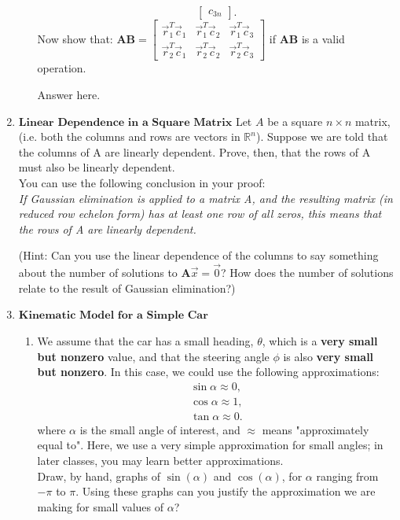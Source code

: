 \documentclass[11pt]{article}
\def\R{\mathbb{R}} %
\def\A{\textbf{A}} %
\def\AB{\textbf{AB}}
\begin{document}
\begin{enumerate}
\begin{enumerate}
\[\begin{bmatrix}
                                    c_{3n}
                        \end{bmatrix}.
                \]
                Now show that:
$\AB = \begin{bmatrix}
    \vec r_1^T \vec c_1 & \vec r_1^T \vec c_2 & \vec r_1^T \vec c_3 \\
    \vec r_2^T \vec c_1 & \vec r_2^T \vec c_2 & \vec r_2^T \vec c_3
\end{bmatrix}$ if $\AB$ is a valid operation.
        \begin{Answer}
            Answer here.
        \end{Answer}
       \end{enumerate}
   
   \newpage
   \item $\textbf{Linear Dependence in a Square Matrix}$
   Let $A$ be a square $n\times n$ matrix, (i.e. both the columns and rows are vectors in $\R^n$). Suppose we are told that the columns of A are linearly dependent. Prove, then, that the rows of A must also be linearly dependent.
   \\
    You can use the following conclusion in your proof:
    \\
    \textit{If Gaussian elimination is applied to a matrix A, and the resulting matrix (in reduced row echelon form) has at least one row of all zeros, this means that the rows of A are linearly dependent.}
    
    (Hint: Can you use the linear dependence of the columns to say something about the number of solutions
    to $\A\vec x =\vec 0$? How does the number of solutions relate to the result of Gaussian elimination?)

   \newpage
   \item $\textbf{Kinematic Model for a Simple Car}$
   \begin{enumerate}
       \item We assume that the car has a small heading, $\theta$, which is a \textbf{very small but nonzero }value, and that the steering angle $\phi$ is also \textbf{very small but nonzero}. In this case, we could use the following approximations:
        \begin{gather*}
            \sin{\alpha} \approx 0,
            \\
            \cos{\alpha} \approx 1,
            \\
            \tan{\alpha} \approx 0.
        \end{gather*}
        where $\alpha$ is the small angle of interest, and $\approx$ means "approximately equal to". Here, we use a very simple approximation for small angles; in later classes, you may learn better approximations. 
        \\
        Draw, by hand, graphs of $\sin(\alpha)$ and $\cos(\alpha)$, for $\alpha$ ranging from $-\pi$ to $\pi$. Using these graphs can you justify the approximation we are making for small values of $\alpha$?
        

\end{enumerate}
\end{enumerate}
\end{document}
